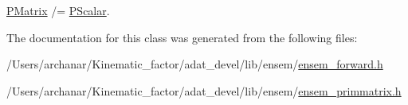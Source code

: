 \mbox{\hyperlink{classENSEM_1_1PMatrix}{P\+Matrix}} /= \mbox{\hyperlink{classENSEM_1_1PScalar}{P\+Scalar}}. 



The documentation for this class was generated from the following files\+:\begin{DoxyCompactItemize}
\item 
/\+Users/archanar/\+Kinematic\+\_\+factor/adat\+\_\+devel/lib/ensem/\mbox{\hyperlink{lib_2ensem_2ensem__forward_8h}{ensem\+\_\+forward.\+h}}\item 
/\+Users/archanar/\+Kinematic\+\_\+factor/adat\+\_\+devel/lib/ensem/\mbox{\hyperlink{lib_2ensem_2ensem__primmatrix_8h}{ensem\+\_\+primmatrix.\+h}}\end{DoxyCompactItemize}
